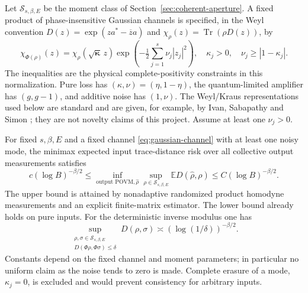 Let $\mathcal S_{s,\beta,E}$ be the moment class of
Section~\ref{sec:coherent-aperture}. A fixed product of phase-insensitive
Gaussian channels is specified, in the Weyl convention
$D(z)=\exp(za^*-\overline z a)$ and
$\chi_\rho(z)=\operatorname{Tr}(\rho D(z))$, by
\[
 \chi_{\Phi(\rho)}(z)
 =\chi_\rho(\sqrt{\boldsymbol\kappa}\,z)
             \exp\!\left(-\tfrac12\sum_{j=1}^s\nu_j|z_j|^2\right),
 \quad \kappa_j>0,\quad \nu_j\ge|1-\kappa_j|.
 \tag{D.1}\label{eq:gaussian-channel}
\]
The inequalities are the physical complete-positivity constraints in this
normalization. Pure loss has $(\kappa,\nu)=(\eta,1-\eta)$, the quantum-limited
amplifier has $(g,g-1)$, and additive noise has $(1,\nu)$.
The Weyl/Kraus representations used below are standard and are given, for
example, by Ivan, Sabapathy and Simon \cite{ISS2011}; they are not novelty
claims of this project. Assume at least one $\nu_j>0$.

\begin{theorem}\label{thm:gaussian-inverse}
For fixed $s,\beta,E$ and a fixed channel \eqref{eq:gaussian-channel} with at
least one noisy mode, the minimax expected input trace-distance risk over
all collective output measurements satisfies
\[
 \boxed{c(\log B)^{-\beta/2}\le
       \inf_{\text{output POVM},\widehat\rho}
          \sup_{\rho\in\mathcal S_{s,\beta,E}}
                   \mathbb E D(\widehat\rho,\rho)
             \le C(\log B)^{-\beta/2}.}
 \tag{D.2}\label{eq:gaussian-rate}
\]
The upper bound is attained by nonadaptive randomized product homodyne
measurements and an explicit finite-matrix estimator. The lower bound
already holds on pure inputs. For the deterministic inverse modulus one has
\[
 \sup_{\substack{\rho,\sigma\in\mathcal S_{s,\beta,E}\\
                    D(\Phi\rho,\Phi\sigma)\le\delta}}
                 D(\rho,\sigma)
       \asymp (\log(1/\delta))^{-\beta/2}.
 \tag{D.3}\label{eq:gaussian-modulus}
\]
Constants depend on the fixed channel and moment parameters; in particular
no uniform claim as the noise tends to zero is made. Complete erasure of a
mode, $\kappa_j=0$, is excluded and would prevent consistency for arbitrary
inputs.
\end{theorem}

